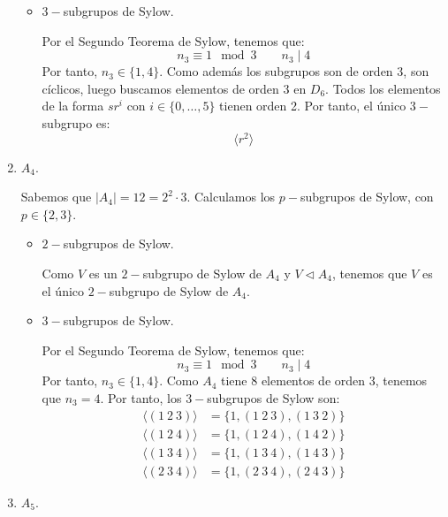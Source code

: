 \begin{ejercicio}
\begin{enumerate}
\begin{itemize}
            \item $3-$subgrupos de Sylow.
            
            Por el Segundo Teorema de Sylow, tenemos que:
            \begin{equation*}
                n_3 \equiv 1 \mod 3 \qquad n_3 \mid 4
            \end{equation*}
            Por tanto, $n_3\in \{1,4\}$. Como además los subgrupos son de orden $3$, son cíclicos, luego buscamos elementos de orden $3$ en $D_6$. Todos los elementos de la forma $sr^i$ con $i\in \{0,\dots,5\}$ tienen orden 2. Por tanto, el único $3-$subgrupo es:
            \begin{equation*}
                \langle r^2\rangle
            \end{equation*}
        \end{itemize}

        \item $A_4$.
        
        Sabemos que $|A_4|=12=2^2\cdot 3$. Calculamos los $p-$subgrupos de Sylow, con $p\in \{2,3\}$.
        \begin{itemize}
            \item $2-$subgrupos de Sylow.
            
            Como $V$ es un $2-$subgrupo de Sylow de $A_4$ y $V\lhd A_4$, tenemos que $V$ es el único $2-$subgrupo de Sylow de $A_4$.
            \item $3-$subgrupos de Sylow.
            
            Por el Segundo Teorema de Sylow, tenemos que:
            \begin{equation*}
                n_3 \equiv 1 \mod 3 \qquad n_3 \mid 4
            \end{equation*}
            Por tanto, $n_3\in \{1,4\}$. Como $A_4$ tiene $8$ elementos de orden $3$, tenemos que $n_3=4$. Por tanto, los $3-$subgrupos de Sylow son:
            \begin{align*}
                \langle (1\ 2\ 3) \rangle &= \{1,(1\ 2\ 3),(1\ 3\ 2)\}\\
                \langle (1\ 2\ 4) \rangle &= \{1,(1\ 2\ 4),(1\ 4\ 2)\}\\
                \langle (1\ 3\ 4) \rangle &= \{1,(1\ 3\ 4),(1\ 4\ 3)\}\\
                \langle (2\ 3\ 4) \rangle &= \{1,(2\ 3\ 4),(2\ 4\ 3)\}
            \end{align*}
        \end{itemize}
        \item $A_5$.
        

\end{enumerate}
\end{ejercicio}
